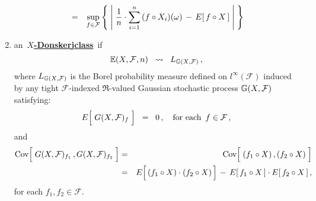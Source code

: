 \begin{definition}
\begin{enumerate}
\begin{eqnarray*}
	\\
	& = &
		\underset{f\in\mathcal{F}}{\sup}\left\{\;
			\left\vert\;
				\dfrac{1}{n}\cdot \overset{n}{\underset{i=1}{\sum}}\,(f \circ X_{i})(\omega)
				\,\overset{{\color{white}+}}{-}\,
				E[\,f \circ X\,]
			\;\right\vert
		\;\right\}
	\end{eqnarray*}
\item
	an \,\underline{\textbf{$X$-Donsker{\color{white}j}class}}\, if
	\begin{equation*}
	\mathbb{E}(X,\mathcal{F},n) \;\;\rightsquigarrow\;\; L_{\mathbb{G}(X,\mathcal{F})}\,,
	\end{equation*}
	where $L_{\mathbb{G}(X,\mathcal{F})}$ is the Borel probability measure defined
	on $l^{\infty}(\mathcal{F})$ induced by any tight $\mathcal{F}$-indexed $\Re$-valued
	Gaussian stochastic process $\mathbb{G}(X,\mathcal{F})$ satisfying:
	\begin{equation*}
	E\!\left[\;\overset{{\color{white}.}}{G}(X,\mathcal{F})_{f}\;\right]
	\;\; = \;\;
		0\,, \quad\textnormal{for each \,$f\in\mathcal{F}$}\,,
	\end{equation*}
	and
	\begin{eqnarray*}
	\Cov\!\left[\;G(X,\mathcal{F})_{f_{1}}\,\overset{{\color{white}\vert}}{,}\,G(X,\mathcal{F})_{f_{2}}\;\right]
	& = &
		\Cov\!\left[\;(f_{1} \circ X) \,\overset{{\color{white}\vert}}{,}\, (f_{2} \circ X)\;\right]
	\\
	& = &
		E\!\left[\,(f_{1} \circ X)\!\overset{{\color{white}-}}{\cdot}\!(f_{2} \circ X)\,\right]
		\,-\,
		E\!\left[\,f_{1} \circ X\,\right] \cdot E\!\left[\,f_{2} \circ X\,\right],
	\end{eqnarray*}
	for each $f_{1}, f_{2} \in \mathcal{F}$.
\end{enumerate}
\end{definition}


\renewcommand{\theenumi}{\roman{enumi}}
\renewcommand{\labelenumi}{\textnormal{(\theenumi)}$\;\;$}

